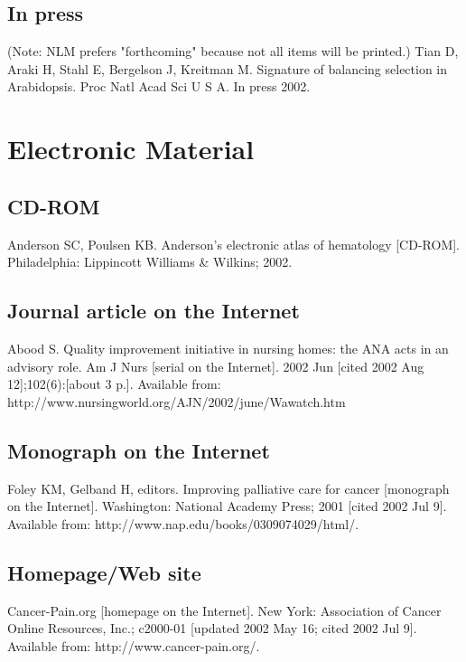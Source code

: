 \documentclass[a4paper,10pt]{article}
\begin{document}
\subsection{In press}

(Note: NLM prefers "forthcoming" because not all items will be printed.)
\linebreak 
Tian D, Araki H, Stahl E, Bergelson J, Kreitman M. Signature of balancing selection in Arabidopsis. Proc Natl Acad Sci U S A. In press 2002.\cite{ tian.araki.ea:signature}

\section{Electronic Material}

\subsection{CD-ROM}

Anderson SC, Poulsen KB. Anderson's electronic atlas of hematology [CD-ROM]. Philadelphia: Lippincott Williams \& Wilkins; 2002.\cite{anderson.poulsen:andersons}

\subsection{Journal article on the Internet}

Abood S. Quality improvement initiative in nursing homes: the ANA acts in an advisory role. Am J Nurs [serial on the Internet]. 2002 Jun [cited 2002 Aug 12];102(6):[about 3 p.]. Available from: http://www.nursingworld.org/AJN/2002/june/Wawatch.htm\cite{abood:quality}

\subsection{Monograph on the Internet}

Foley KM, Gelband H, editors. Improving palliative care for cancer [monograph on the Internet]. Washington: National Academy Press; 2001 [cited 2002 Jul 9]. Available from: http://www.nap.edu/books/0309074029/html/.\cite{foley.gelband:improving}

\subsection{Homepage/Web site}

Cancer-Pain.org [homepage on the Internet]. New York: Association of Cancer Online Resources, Inc.; c2000-01 [updated 2002 May 16; cited 2002 Jul 9]. Available from: http://www.cancer-pain.org/.\cite{cancer-pain}
\end{document}
